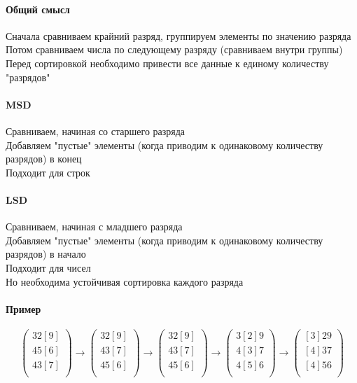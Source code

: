 \documentclass[a4paper,10pt]{article}
\begin{document}
	\paragraph{Общий смысл}
	Сначала сравниваем крайний разряд, группируем элементы по значению разряда \\
	Потом сравниваем числа по следующему разряду (сравниваем внутри группы) \\
	Перед сортировкой необходимо привести все данные к единому количеству "разрядов"
	\paragraph{MSD}
	Сравниваем, начиная со старшего разряда \\
	Добавляем "пустые" элементы (когда приводим к одинаковому количеству разрядов) в конец \\
	Подходит для строк \\
	\paragraph{LSD}
	Сравниваем, начиная с младшего разряда \\
	Добавляем "пустые" элементы (когда приводим к одинаковому количеству разрядов) в начало \\
	Подходит для чисел \\
	Но необходима устойчивая сортировка каждого разряда \\
	\paragraph{Пример}
	\[
		\begin{pmatrix}
			32[9] \\
			45[6] \\
			43[7] \\
		\end{pmatrix}
		\rightarrow
		\begin{pmatrix}
			32[9] \\
			43[7] \\
			45[6] \\
		\end{pmatrix}
		\rightarrow
		\begin{pmatrix}
			32[9] \\
			43[7] \\
			45[6] \\
		\end{pmatrix}
		\rightarrow
		\begin{pmatrix}
			3[2]9 \\
			4[3]7 \\
			4[5]6 \\
		\end{pmatrix}
		\rightarrow
		\begin{pmatrix}
			[3]29 \\
			[4]37 \\
			[4]56 \\
		\end{pmatrix}
	\]	
\end{document}
